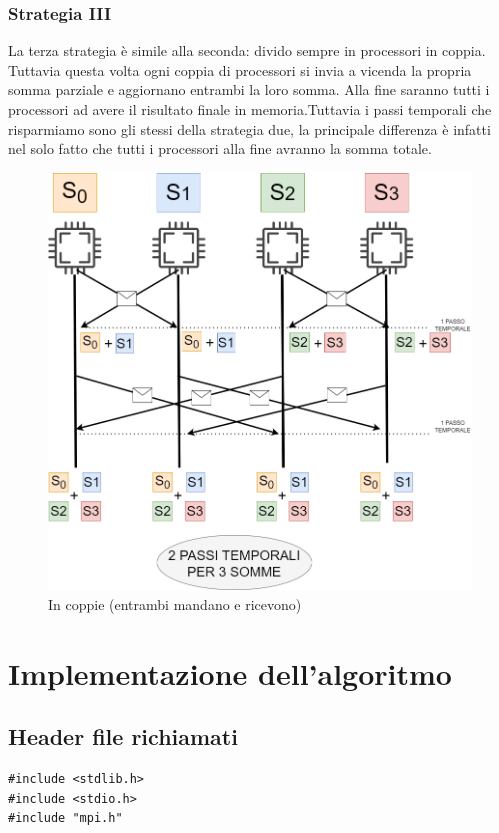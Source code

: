 \documentclass{article}
\begin{document}
\subsubsection{Strategia III}
    La terza strategia è simile alla seconda: divido sempre in processori in coppia.
    Tuttavia questa volta ogni coppia di processori si invia a vicenda la propria somma parziale e aggiornano entrambi la loro somma. Alla fine saranno tutti i processori ad avere il risultato finale in memoria.Tuttavia i passi temporali che risparmiamo sono gli stessi della strategia due, la principale differenza è infatti nel solo fatto che tutti i processori alla fine avranno la somma totale.
    \begin{figure}[!h tbp]
        \centering
        \includegraphics[width=1\linewidth]{strategia_III.drawio.png}
        \caption{In coppie (entrambi mandano e ricevono)}
        \label{fig:enter-label}
    \end{figure}
\clearpage
\section{Implementazione dell'algoritmo}
\subsection{Header file richiamati}
\begin{lstlisting}
#include <stdlib.h>
#include <stdio.h>
#include "mpi.h"
\end{lstlisting}
\end{document}

